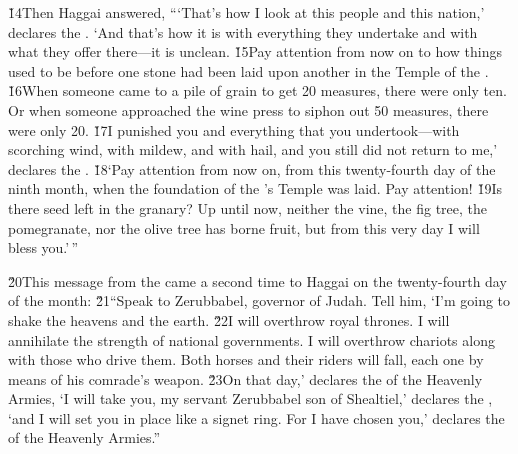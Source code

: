 \v{14}Then Haggai answered, ```That's how I look at this people and this nation,' declares the . `And that's how it is with everything they undertake and with what they offer there---it is unclean. \v{15}Pay attention from now on to how things used to be before one stone had been laid upon another in the Temple of the . \v{16}When someone came to a pile of grain to get 20 measures, there were only ten. Or when someone approached the wine press to siphon out 50 measures, there were only 20. \v{17}I punished you and everything that you undertook---with scorching wind, with mildew, and with hail, and you still did not return to me,' declares the . \v{18}`Pay attention from now on, from this twenty-fourth day of the ninth month, when the foundation of the 's Temple was laid. Pay attention! \v{19}Is there seed left in the granary? Up until now, neither the vine, the fig tree, the pomegranate, nor the olive tree has borne fruit, but from this very day I will bless you.'\,''

\v{20}This message from the  came a second time to Haggai on the twenty-fourth day of the month: \v{21}``Speak to Zerubbabel, governor of Judah. Tell him, `I'm going to shake the heavens and the earth. \v{22}I will overthrow royal thrones. I will annihilate the strength of national governments. I will overthrow chariots along with those who drive them. Both horses and their riders will fall, each one by means of his comrade's weapon. \v{23}On that day,' declares the  of the Heavenly Armies, `I will take you, my servant Zerubbabel son of Shealtiel,' declares the , `and I will set you in place like a signet ring. For I have chosen you,' declares the  of the Heavenly Armies.''
